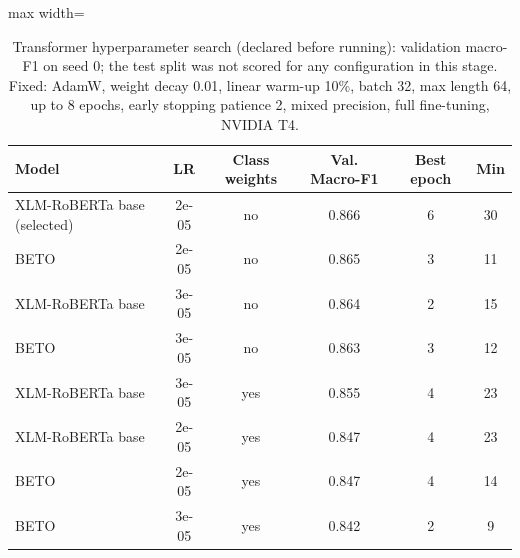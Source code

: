 \begin{table}[!t]
\centering
\caption{Transformer hyperparameter search (declared before running): validation macro-F1 on seed 0; the test split was not scored for any configuration in this stage. Fixed: AdamW, weight decay 0.01, linear warm-up 10\%, batch 32, max length 64, up to 8 epochs, early stopping patience 2, mixed precision, full fine-tuning, NVIDIA T4.}
\label{tab:search}
\footnotesize
\begin{adjustbox}{max width=\columnwidth}
\begin{tabular}{lccccc}
\hline
Model & LR & Class weights & Val. Macro-F1 & Best epoch & Min \\
\hline
XLM-RoBERTa base (selected) & 2e-05 & no & 0.866 & 6 & 30 \\
BETO & 2e-05 & no & 0.865 & 3 & 11 \\
XLM-RoBERTa base & 3e-05 & no & 0.864 & 2 & 15 \\
BETO & 3e-05 & no & 0.863 & 3 & 12 \\
XLM-RoBERTa base & 3e-05 & yes & 0.855 & 4 & 23 \\
XLM-RoBERTa base & 2e-05 & yes & 0.847 & 4 & 23 \\
BETO & 2e-05 & yes & 0.847 & 4 & 14 \\
BETO & 3e-05 & yes & 0.842 & 2 & 9 \\
\hline
\end{tabular}
\end{adjustbox}
\end{table}
